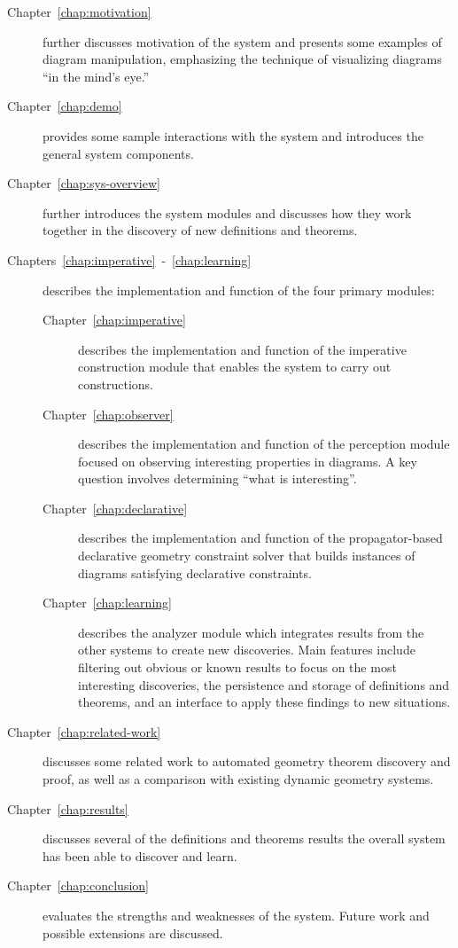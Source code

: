\begin{description}

\item [Chapter~\ref{chap:motivation}] further discusses motivation of
  the system and presents some examples of diagram manipulation,
  emphasizing the technique of visualizing diagrams ``in the mind's
  eye.''

\item [Chapter~\ref{chap:demo}] provides some sample interactions with
  the system and introduces the general system components.

\item[Chapter~\ref{chap:sys-overview}] further introduces the system
  modules and discusses how they work together in the discovery of new
  definitions and theorems.

\item[Chapters~\ref{chap:imperative}~-~\ref{chap:learning}] describes
  the implementation and function of the four primary modules:

\begin{description}

\item[Chapter~\ref{chap:imperative}] describes the implementation
  and function of the imperative construction
  module that enables the system to carry out constructions.

\item[Chapter~\ref{chap:observer}] describes the implementation and
  function of the perception module focused on observing interesting
  properties in diagrams. A key question involves determining ``what
  is interesting''.

\item[Chapter~\ref{chap:declarative}] describes the implementation
  and function of the propagator-based declarative geometry constraint
  solver that builds instances of diagrams satisfying declarative
  constraints.

\item[Chapter~\ref{chap:learning}] describes the analyzer module which
  integrates results from the other systems to create new
  discoveries. Main features include filtering out obvious or known
  results to focus on the most interesting discoveries, the
  persistence and storage of definitions and theorems, and an
  interface to apply these findings to new situations.

\end{description}

\item[Chapter~\ref{chap:related-work}] discusses some related work to
  automated geometry theorem discovery and proof, as well as a
  comparison with existing dynamic geometry systems.

\item[Chapter~\ref{chap:results}] discusses several of the definitions
  and theorems results the overall system has been able to discover
  and learn.

\item[Chapter~\ref{chap:conclusion}] evaluates the strengths and
  weaknesses of the system. Future work and possible extensions are
  discussed.

\end{description}
